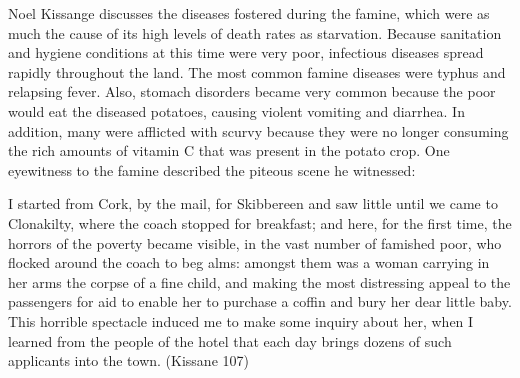 \begin{Spacing}{1.5}

\hspace{.4in}Noel Kissange discusses the diseases fostered during the famine, which were as much the cause of its high levels of death rates as starvation. Because sanitation and hygiene conditions at this time were very poor, infectious diseases spread rapidly throughout the land. The most common famine diseases were typhus and relapsing fever. Also, stomach disorders became very common because the poor would eat the diseased potatoes, causing violent vomiting and diarrhea. In addition, many were afflicted with scurvy because they were no longer consuming the rich amounts of vitamin C that was present in the potato crop. One eyewitness to the famine described the piteous scene he witnessed:

\begin{adjustwidth}{.8in}{0in}

I started from Cork, by the mail, for Skibbereen and saw little until we came to Clonakilty, where the coach stopped for breakfast; and here, for the first time, the horrors of the poverty became visible, in the vast number of famished poor, who flocked around the coach to beg alms: amongst them was a woman carrying in her arms the corpse of a fine child, and making the most distressing appeal to the passengers for aid to enable her to purchase a coffin and bury her dear little baby. This horrible spectacle induced me to make some inquiry about her, when I learned from the people of the hotel that each day brings dozens of such applicants into the town. (Kissane 107)


\end{adjustwidth}
\end{Spacing}
